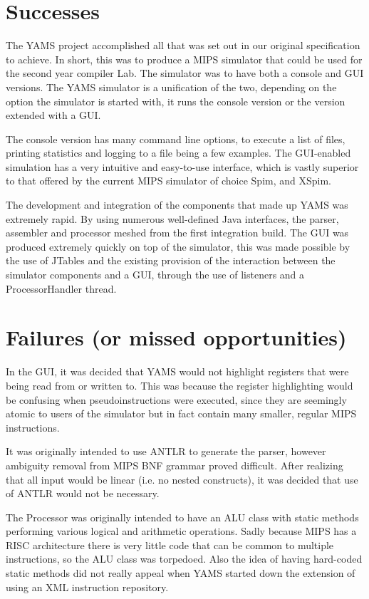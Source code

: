 \section{Successes}

The YAMS project accomplished all that was set out in our original specification to achieve. In short, this was to produce a MIPS simulator that could be used for the second year compiler Lab. The simulator was to have both a console and GUI versions. The YAMS simulator is a unification of the two, depending on the option the simulator is started with, it runs the console version or the version extended with a GUI.

The console version has many command line options, to execute a list of files, printing statistics and logging to a file being a few examples. The GUI-enabled simulation has a very intuitive and easy-to-use interface, which is vastly superior to that offered by the current MIPS simulator of choice Spim, and XSpim.

The development and integration of the components that made up YAMS was extremely rapid. By using numerous well-defined Java interfaces, the parser, assembler and processor meshed from the first integration build. The GUI was produced extremely quickly on top of the simulator, this was made possible by the use of JTables and the existing provision of the interaction between the simulator components and a GUI, through the use of listeners and a ProcessorHandler thread.


\section{Failures (or missed opportunities)}

In the GUI, it was decided that YAMS would not highlight registers that were being read from or written to. This was because the register highlighting would be confusing when pseudoinstructions were executed, since they are seemingly atomic to users of the simulator but in fact contain many smaller, regular MIPS instructions.

It was originally intended to use ANTLR to generate the parser, however ambiguity removal from MIPS BNF grammar proved difficult. After realizing that all input would be linear (i.e. no nested constructs), it was decided that use of ANTLR would not be necessary.

The Processor was originally intended to have an ALU class with static methods performing various logical and arithmetic operations. Sadly because MIPS has a RISC architecture there is very little code that can be common to multiple instructions, so the ALU class was torpedoed. Also the idea of having hard-coded static methods did not really appeal when YAMS started down the extension of using an XML instruction repository.

